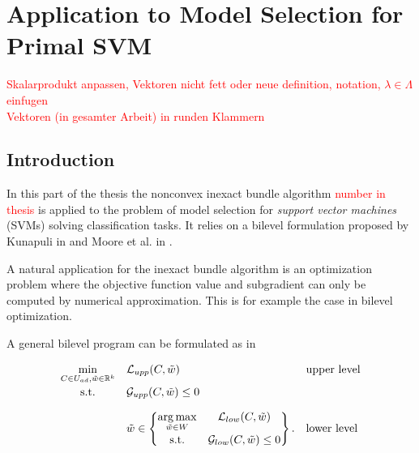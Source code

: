 \section{Application to Model Selection for Primal SVM}

\textcolor{red}{Skalarprodukt anpassen, Vektoren nicht fett oder neue definition, notation, \(\lambda \in \Lambda\) einfugen\\
Vektoren (in gesamter Arbeit) in runden Klammern}

\subsection{Introduction}

In this part of the thesis the nonconvex inexact bundle algorithm \textcolor{red}{number in thesis} is applied to the problem of model selection for \emph{support vector machines} (SVMs) solving classification tasks.
It relies on a bilevel formulation proposed by Kunapuli in \cite{Kunapuli2008} and Moore et al. in \cite{Moore2011}.

A natural application for the inexact bundle algorithm is an optimization problem where the objective function value and subgradient can only be computed by numerical approximation. This is for example the case in bilevel optimization.

A general bilevel program can be formulated as in \cite[p. 20]{Kunapuli2008}

\begin{equation}
	\begin{array}{cll}
	\displaystyle\min_{C \in U_{ad}, \tilde{w} \in \R^k} & \mathcal{L}_{upp}(C,\tilde{w}) & \text{upper level} \vspace{0.5ex}\\
	\text{s.t.} & \mathcal{G}_{upp}(C,\tilde{w}) \leq 0 & \vspace{1em}\\
	& \tilde{w} \in \begin{Bmatrix} \displaystyle\argmax_{\tilde{w}\in W} & \mathcal{L}_{low}(C,\tilde{w}) \vspace{0.5ex}\\
	                        \text{s.t.} & \mathcal{G}_{low}(C,\tilde{w}) \leq 0 
													\end{Bmatrix}. & \text{lower level}
	\end{array}
	\label{bilevel}
\end{equation}

